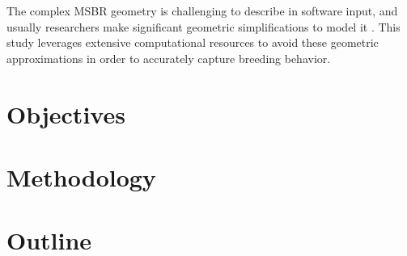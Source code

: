 The complex \gls{MSBR} geometry is challenging to describe in software input, 
and usually researchers make significant geometric simplifications to model it 
\cite{park_whole_2015}. This study leverages extensive computational 
resources to avoid these geometric approximations in order to accurately capture 
breeding behavior. 

\section{Objectives}

\section{Methodology}

\section{Outline}

